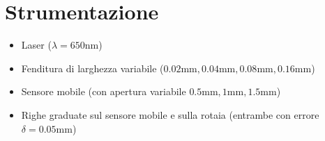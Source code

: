 \documentclass[../main.tex]{subfiles}
\begin{document}
\section{Strumentazione}

\begin{itemize}
    \item Laser ($\lambda = 650\text{nm}$)
    \item Fenditura di larghezza variabile ($0.02\text{mm}, 0.04\text{mm}, 0.08\text{mm}, 0.16\text{mm}$)
    \item Sensore mobile (con apertura variabile $0.5\text{mm}, 1\text{mm}, 1.5\text{mm}$)
    \item Righe graduate sul sensore mobile e sulla rotaia (entrambe con errore $\delta = 0.05\text{mm}$)
\end{itemize}
\end{document}
